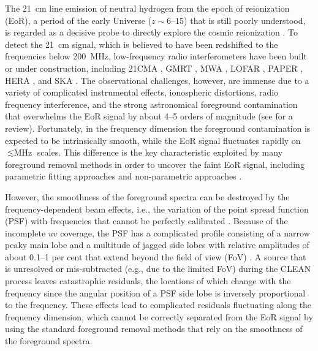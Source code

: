 \documentclass[letters,fleqn,usenatbib,onecolumn]{mnras}
\begin{document}
The \SI{21}{\cm} line emission of neutral hydrogen from the
epoch of reionization (EoR), a period of the early Universe
($z \sim \numrange{6}{15}$) that is still poorly understood, is regarded
as a decisive probe to directly explore the cosmic reionization
\citep[see][for reviews]{furlanetto2006rev,furlanetto2016rev}.
To detect the \SI{21}{\cm} signal, which is believed to have been
redshifted to the frequencies below \SI{200}{\MHz}, low-frequency
radio interferometers have been built or under construction, including
21CMA \citep{zheng2016}, GMRT \citep{paciga2011}, MWA \citep{tingay2013},
LOFAR \citep{vanHaarlem2013}, PAPER \citep{parsons2010},
HERA \citep{deboer2017}, and SKA \citep{koopmans2015rev}.
The observational challenges, however, are immense due to a variety of
complicated instrumental effects, ionospheric distortions, radio frequency
interference, and the strong astronomical foreground contamination that
overwhelms the EoR signal by about \numrange{4}{5} orders of magnitude
(see \citealt{morales2010rev} for a review).
Fortunately, in the frequency dimension the foreground contamination
is expected to be intrinsically smooth, while the EoR signal fluctuates
rapidly on $\lesssim \si{\MHz}$ scales.
This difference is the key characteristic exploited by many
foreground removal methods in order to uncover the faint EoR signal,
including parametric fitting approaches
\citep[e.g.,][]{wang2006,liu2009fgrm,wang2013}
and non-parametric approaches
\citep[e.g.,][]{harker2009,chapman2013,mertens2018}.

However, the smoothness of the foreground spectra can be destroyed by
the frequency-dependent beam effects, i.e., the variation of the point
spread function (PSF) with frequencies that cannot be perfectly
calibrated \citep{liu2009ps}.
Because of the incomplete $uv$ coverage,
the PSF has a complicated profile consisting of a narrow peaky main lobe
and a multitude of jagged side lobes with relative amplitudes of about
\numrange{0.1}{1} per cent that extend beyond the field of view (FoV)
\citep[e.g.,][figures 1 and 3]{liu2009ps}.
{\color{cyan}%
A source that is unresolved or mis-subtracted (e.g., due to the limited
FoV) during the CLEAN process leaves catastrophic residuals,
the locations of which change with the frequency since the angular
position of a PSF side lobe is inversely proportional to the frequency.}
These effects lead to complicated residuals fluctuating along the
frequency dimension, which cannot be correctly separated from the EoR
signal by using the standard foreground removal methods that rely on
the smoothness of the foreground spectra.
\end{document}
